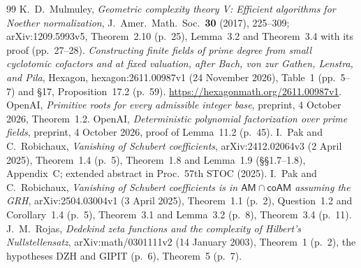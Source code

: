 \documentclass[11pt]{amsart}
\theoremstyle{definition}
\theoremstyle{remark}
\begin{document}
\begin{thebibliography}{99}
 K.~D.~Mulmuley, \emph{Geometric complexity theory V: Efficient algorithms for Noether normalization}, J.~Amer.\ Math.\ Soc.\ \textbf{30} (2017), 225--309; arXiv:1209.5993v5, Theorem~2.10 (p.~25), Lemma~3.2 and Theorem~3.4 with its proof (pp.~27--28).
 \emph{Constructing finite fields of prime degree from small cyclotomic cofactors and at fixed valuation, after Bach, von zur Gathen, Lenstra, and Pila}, Hexagon, hexagon:2611.00987v1 (24 November 2026), Table~1 (pp.~5--7) and \S17, Proposition~17.2 (p.~59). \url{https://hexagonmath.org/2611.00987v1}.
 OpenAI, \emph{Primitive roots for every admissible integer base}, preprint, 4 October 2026, Theorem~1.2.
 OpenAI, \emph{Deterministic polynomial factorization over prime fields}, preprint, 4 October 2026, proof of Lemma~11.2 (p.~45).
 I.~Pak and C.~Robichaux, \emph{Vanishing of Schubert coefficients}, arXiv:2412.02064v3 (2 April 2025), Theorem~1.4 (p.~5), Theorem~1.8 and Lemma~1.9 (\S\S1.7--1.8), Appendix~C; extended abstract in Proc.\ 57th STOC (2025).
 I.~Pak and C.~Robichaux, \emph{Vanishing of Schubert coefficients is in $\mathsf{AM}\cap\mathsf{coAM}$ assuming the GRH}, arXiv:2504.03004v1 (3 April 2025), Theorem~1.1 (p.~2), Question~1.2 and Corollary~1.4 (p.~5), Theorem~3.1 and Lemma~3.2 (p.~8), Theorem~3.4 (p.~11).
 J.~M.~Rojas, \emph{Dedekind zeta functions and the complexity of Hilbert's Nullstellensatz}, arXiv:math/0301111v2 (14 January 2003), Theorem~1 (p.~2), the hypotheses DZH and GIPIT (p.~6), Theorem~5 (p.~7).
\end{thebibliography}
\end{document}
